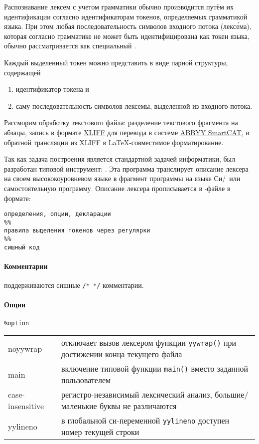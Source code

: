 Распознавание лексем с учетом грамматики обычно производится путём их
идентификации согласно идентификаторам токенов, определяемых грамматикой языка.
При этом любая последовательность символов входного потока (лекс\'{е}ма),
которая согласно грамматике не может быть идентифицирована как токен языка,
обычно рассматривается как специальный .

\bigskip
Каждый выделенный токен можно представить в виде парной структуры,
содержащей
\begin{enumerate}
  \item идентификатор токена и
  \item саму последовательность символов лексемы, выделенной из входного
потока.
\end{enumerate}

\bigskip
Рассморим обработку текстового файла: разделение текстового фрагмента на абзацы,
запись в формате
\href{http://docs.oasis-open.org/xliff/xliff-core/xliff-core.html}{XLIFF} для
перевода в системе \href{http://smartcat.pro}{ABBYY SmartCAT}, и обратной
трансляции из XLIFF в \LaTeX-совместимое форматирование.

\bigskip
Так как задача построения  является стандартной задачей информатики, был разработан типовой
инструмент:  . Эта программа
транслирует описание лексера на своем высококоуровневом языке в фрагмент
программы на языке Си/\cpp\ или самостоятельную программу. Описание лексера
прописывается в -файле в формате:

\begin{verbatim}
определения, опции, декларации
%%
правила выделения токенов через регулярки
%%
сишный код
\end{verbatim}

\paragraph{Комментарии} поддерживаются сишные \verb|/* */| комментарии.

\paragraph{Опции} \verb|%option|

\bigskip\noindent
\begin{tabular}{l l}
noyywrap & отключает вызов лексером функции \verb|yywrap()| при достижении
конца текущего файла \\
main & включение типовой функции \verb|main()| вместо заданной пользователем \\
case-insensitive & регистро-независимый лексический анализ, большие/маленькие
буквы не различаются \\
yylineno & в глобальной си-переменной \verb|yylineno| доступен номер
текущей строки \\
\end{tabular}

